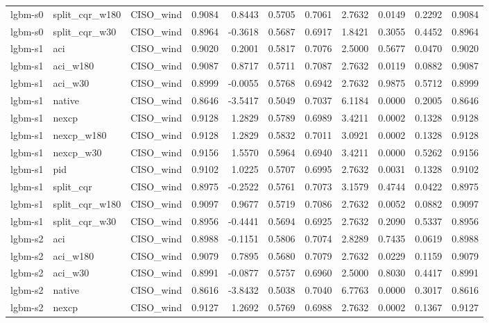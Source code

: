 \begin{tabular}{lllrrrrrrrr}
lgbm-s0 & split_cqr_w180 & CISO_wind & 0.9084 & 0.8443 & 0.5705 & 0.7061 & 2.7632 & 0.0149 & 0.2292 & 0.9084 \\
lgbm-s0 & split_cqr_w30 & CISO_wind & 0.8964 & -0.3618 & 0.5687 & 0.6917 & 1.8421 & 0.3055 & 0.4452 & 0.8964 \\
lgbm-s1 & aci & CISO_wind & 0.9020 & 0.2001 & 0.5817 & 0.7076 & 2.5000 & 0.5677 & 0.0470 & 0.9020 \\
lgbm-s1 & aci_w180 & CISO_wind & 0.9087 & 0.8717 & 0.5711 & 0.7087 & 2.7632 & 0.0119 & 0.0882 & 0.9087 \\
lgbm-s1 & aci_w30 & CISO_wind & 0.8999 & -0.0055 & 0.5768 & 0.6942 & 2.7632 & 0.9875 & 0.5712 & 0.8999 \\
lgbm-s1 & native & CISO_wind & 0.8646 & -3.5417 & 0.5049 & 0.7037 & 6.1184 & 0.0000 & 0.2005 & 0.8646 \\
lgbm-s1 & nexcp & CISO_wind & 0.9128 & 1.2829 & 0.5789 & 0.6989 & 3.4211 & 0.0002 & 0.1328 & 0.9128 \\
lgbm-s1 & nexcp_w180 & CISO_wind & 0.9128 & 1.2829 & 0.5832 & 0.7011 & 3.0921 & 0.0002 & 0.1328 & 0.9128 \\
lgbm-s1 & nexcp_w30 & CISO_wind & 0.9156 & 1.5570 & 0.5964 & 0.6940 & 3.4211 & 0.0000 & 0.5262 & 0.9156 \\
lgbm-s1 & pid & CISO_wind & 0.9102 & 1.0225 & 0.5707 & 0.6995 & 2.7632 & 0.0031 & 0.1328 & 0.9102 \\
lgbm-s1 & split_cqr & CISO_wind & 0.8975 & -0.2522 & 0.5761 & 0.7073 & 3.1579 & 0.4744 & 0.0422 & 0.8975 \\
lgbm-s1 & split_cqr_w180 & CISO_wind & 0.9097 & 0.9677 & 0.5719 & 0.7086 & 2.7632 & 0.0052 & 0.0882 & 0.9097 \\
lgbm-s1 & split_cqr_w30 & CISO_wind & 0.8956 & -0.4441 & 0.5694 & 0.6925 & 2.7632 & 0.2090 & 0.5337 & 0.8956 \\
lgbm-s2 & aci & CISO_wind & 0.8988 & -0.1151 & 0.5806 & 0.7074 & 2.8289 & 0.7435 & 0.0619 & 0.8988 \\
lgbm-s2 & aci_w180 & CISO_wind & 0.9079 & 0.7895 & 0.5680 & 0.7079 & 2.7632 & 0.0229 & 0.1159 & 0.9079 \\
lgbm-s2 & aci_w30 & CISO_wind & 0.8991 & -0.0877 & 0.5757 & 0.6960 & 2.5000 & 0.8030 & 0.4417 & 0.8991 \\
lgbm-s2 & native & CISO_wind & 0.8616 & -3.8432 & 0.5038 & 0.7040 & 6.7763 & 0.0000 & 0.3017 & 0.8616 \\
lgbm-s2 & nexcp & CISO_wind & 0.9127 & 1.2692 & 0.5769 & 0.6988 & 2.7632 & 0.0002 & 0.1367 & 0.9127 \\

\end{tabular}
